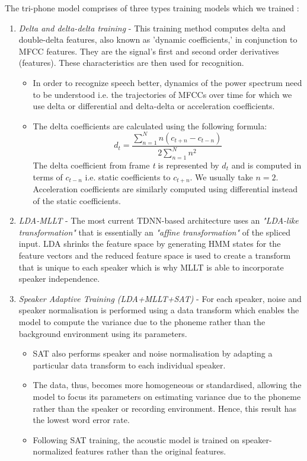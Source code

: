The tri-phone model comprises of three types training models which we trained \cite{raj_note_nodate}:
\begin{enumerate}
    \item \textit{Delta and delta-delta training} - This training method computes delta and double-delta features, also known as 'dynamic coefficients,' in conjunction to MFCC features. They are the signal's first and second order derivatives (features). These characteristics are then used for recognition.
    \begin{itemize}
        \item In order to recognize speech better, dynamics of the power spectrum need to be understood i.e. the trajectories of MFCCs over time for which we use delta or differential and delta-delta or acceleration coefficients. 
        \item The delta coefficients are calculated using the following formula:
        \begin{equation}
        d_{t}=\frac{\sum_{n=1}^{N} n(c_{t+n}-c_{t-n})}{2 \sum_{n=1}^{N}n^2}    
        \end{equation}
        The delta coefficient from frame \textit{t} is represented by $d_{t}$ and is computed in terms of $c_{t-n}$ i.e. static coefficients to $c_{t+n}$. We usually take $n = 2$. Acceleration coefficients are similarly computed using differential instead of the static coefficients.
    \end{itemize}
    \item \textit{LDA-MLLT} - The most current TDNN-based architecture uses an \textit{"LDA-like transformation"} that is essentially an \textit{"affine transformation"} of the spliced input. LDA shrinks the feature space by generating HMM states for the feature vectors and the reduced feature space is used to create a transform that is unique to each speaker which is why MLLT is able to incorporate speaker independence.             
    \item \textit{Speaker Adaptive Training (LDA+MLLT+SAT)} - For each speaker, noise and speaker normalisation is performed using a data transform which enables the model to compute the variance due to the phoneme rather than the background environment using its parameters. 
    \begin{itemize}
        \item SAT also performs speaker and noise normalisation by adapting a particular data transform to each individual speaker. 
        \item The data, thus, becomes more homogeneous or standardised, allowing the model to focus its parameters on estimating variance due to the phoneme rather than the speaker or recording environment. Hence, this result has the lowest word error rate. 
        \item Following SAT training, the acoustic model is trained on speaker-normalized features rather than the original features. 
    \end{itemize}

\end{enumerate}

